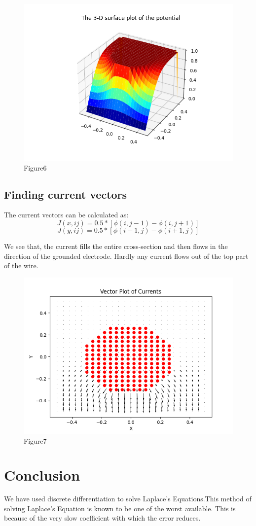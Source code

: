 \documentclass[11pt, a4paper]{article}
\begin{document}
\begin{figure}[!tbh]
\centering
\includegraphics[scale=0.5]{Assgn5_plot6.png} 
\caption{Figure6}
\label{fig6}
\end{figure}


\subsection*{Finding current vectors}
The current vectors can be calculated as:
\begin{equation*}
 J(x,ij)=0.5*[\phi(i,j-1) - \phi(i,j+1)]
\end{equation*}
\begin{equation*} 
 J(y,ij)=0.5*[\phi(i-1,j) - \phi(i+1,j)]
\end{equation*}

We see that, the current fills the entire cross-section and then flows in the direction of the grounded electrode. Hardly any current flows out of the top part of the wire.
\begin{figure}[!tbh]
\centering
\includegraphics[scale=0.45]{Assgn5_plot7.png} 
\caption{Figure7}
\label{fig7}
\end{figure}

\section*{Conclusion}
We have used discrete differentiation to solve Laplace’s Equations.This method
of solving Laplace’s Equation is known to be one of the worst available. This is because of the very slow coefficient with which the error reduces.
\end{document}
